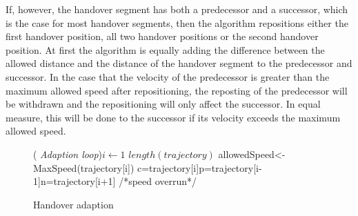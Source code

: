 \documentclass[twocolumn]{bmcart}%
\makeatletter
\newcommand{\removelatexerror}{\let\@latex@error\@gobble}
\makeatother
\begin{document}
If, however, the handover segment has both a predecessor and a successor, which is the case for most handover segments, then the algorithm repositions either the first handover position, all two handover positions or the second handover position. At first the algorithm is equally adding the difference between the allowed distance and the distance of the handover segment to the predecessor and successor. In the case that the velocity of the predecessor is greater than the maximum allowed speed after repositioning, the reposting of the predecessor will be withdrawn and the repositioning will only affect the successor. In equal measure, this will be done to the successor if its velocity exceeds the maximum allowed speed. 

  

\SetAlFnt{\tiny}

\begin{figure}[!t]
	\removelatexerror
	\begin{algorithm}[H]
		\caption{Handover adaption}
		\label{alg:adaption}
		\For( \emph{Adaption loop}){$i\leftarrow 1$ \KwTo $length(trajectory)$}
		{
			allowedSpeed<-MaxSpeed(trajectory[i])\;
			c=trajectory[i]\;p=trajectory[i-1]\;n=trajectory[i+1]\;
			/*speed overrun*/\\
		}
	\end{algorithm}
\end{figure}
\end{document}
